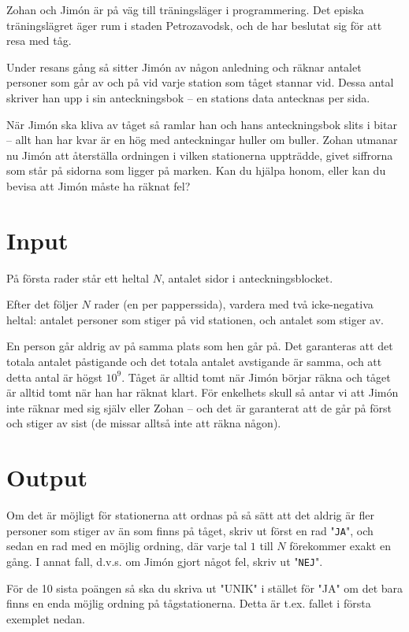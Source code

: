 
Zohan och Jimón är på väg till träningsläger i programmering. Det episka träningslägret äger rum i staden Petrozavodsk, och de har beslutat sig för att resa med tåg.

Under resans gång så sitter Jimón av någon anledning och räknar antalet personer som går av och på vid varje station som tåget stannar vid. Dessa antal skriver han
upp i sin anteckningsbok -- en stations data antecknas per sida.

När Jimón ska kliva av tåget så ramlar han och hans anteckningsbok slits i bitar -- allt han har kvar är en hög med anteckningar huller om buller. Zohan utmanar nu
Jimón att återställa ordningen i vilken stationerna uppträdde, givet siffrorna som står på sidorna som ligger på marken. Kan du hjälpa honom, eller kan du bevisa att
Jimón måste ha räknat fel?

\section*{Input}
På första rader står ett heltal $N$, antalet sidor i anteckningsblocket.

Efter det följer $N$ rader (en per papperssida), vardera med två icke-negativa
heltal: antalet personer som stiger på vid stationen, och antalet som stiger
av.

En person går aldrig av på samma plats som hen går på. Det garanteras att det
totala antalet påstigande och det totala antalet
avstigande är samma, och att detta antal är högst $10^9$. Tåget är alltid tomt
när Jimón börjar räkna och tåget är alltid tomt när han har räknat klart. För
enkelhets skull så antar vi att Jimón inte räknar med sig själv eller Zohan -- och
det är garanterat att de går på först och stiger av sist (de missar alltså inte att
räkna någon).

\section*{Output}
Om det är möjligt för stationerna att ordnas på så sätt att det aldrig är fler
personer som stiger av än som finns på tåget, skriv ut först en rad
"\texttt{JA}", och sedan en rad med en möjlig ordning, där varje tal $1$ till
$N$ förekommer exakt en gång.
I annat fall, d.v.s. om Jimón gjort något fel, skriv ut "\texttt{NEJ}".

För de 10 sista poängen så ska du skriva ut "UNIK" i stället för "JA" om det
bara finns en enda möjlig ordning på tågstationerna. Detta är t.ex. fallet i första exemplet nedan.

